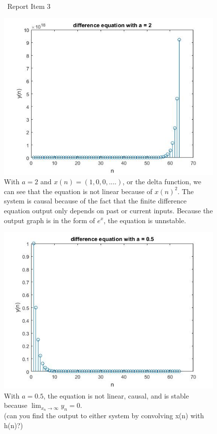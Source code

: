 \documentclass{article}
\begin{document}
\begin{figure}[H]
\ Report Item 3

\includegraphics[scale = .5]{report3}
\\ With $a = 2$ and $x(n) = (1,0,0,....)$, or the delta function, we can see that the equation is not linear because of $x(n)^{2}$. The system is causal because of the fact that the finite difference equation output only depends on past or current inputs. Because the output graph is in the form of $e^x$, the equation is unnstable.
\end{figure}
\begin{figure}[H]
\includegraphics[scale = .5]{report3_2}
\\ With $a = 0.5$, the equation is not linear, causal, and is stable because $\lim_{x_n\to\infty} y_n = 0$.
\\ (can you find the output to either system by convolving x(n) with h(n)?)
\end{figure}
\end{document}
